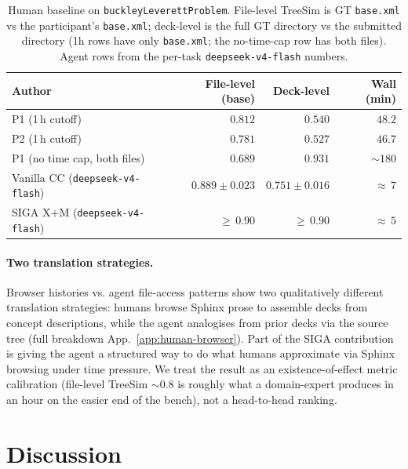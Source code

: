\documentclass{article}
\begin{document}
\begin{table}[h]
  \caption{Human baseline on \texttt{buckleyLeverettProblem}. File-level TreeSim is GT \texttt{base.xml} vs the participant's \texttt{base.xml}; deck-level is the full GT directory vs the submitted directory (1h rows have only \texttt{base.xml}; the no-time-cap row has both files). Agent rows from the per-task \texttt{deepseek-v4-flash} numbers.}
  \label{tab:human-baseline}
  \centering
  \small
  \begin{tabular}{lrrr}
    \toprule
    \textbf{Author} & \textbf{File-level (base)} & \textbf{Deck-level} & \textbf{Wall (min)} \\
    \midrule
    P1 (1\,h cutoff)                          & $0.812$            & $0.540$            & $48.2$ \\
    P2 (1\,h cutoff)                          & $0.781$            & $0.527$            & $46.7$ \\
    P1 (no time cap, both files)              & $0.689$            & $0.931$            & ${\sim}180$ \\
    Vanilla CC (\texttt{deepseek-v4-flash})   & $0.889 \pm 0.023$  & $0.751 \pm 0.016$  & ${\approx}\,7$ \\
    SIGA X+M (\texttt{deepseek-v4-flash})     & ${\geq}\,0.90$     & ${\geq}\,0.90$     & ${\approx}\,5$ \\
    \bottomrule
  \end{tabular}
\end{table}

\paragraph{Two translation strategies.} Browser histories vs. agent file-access patterns show two qualitatively different translation strategies: humans browse Sphinx prose to assemble decks from concept descriptions, while the agent analogises from prior decks via the source tree (full breakdown App.~\ref{app:human-browser}). Part of the SIGA contribution is giving the agent a structured way to do what humans approximate via Sphinx browsing under time pressure. We treat the result as an existence-of-effect metric calibration (file-level TreeSim $\sim\!0.8$ is roughly what a domain-expert produces in an hour on the easier end of the bench), not a head-to-head ranking.


\section{Discussion}
\label{sec:discussion}
\label{sec:analysis}
\label{subsec:limitations}
\end{document}

